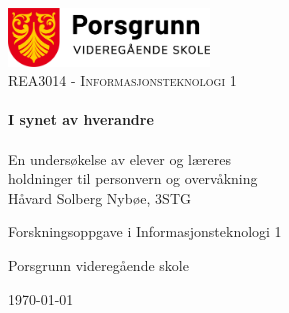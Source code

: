 \begin{titlepage}
    \vbox{ }

    \vbox{ }

    \begin{center}
        \includegraphics[width=0.40\textwidth]{img/porsgrunn-vgs.png}\\[1cm]
        \textsc{\Large REA3014 - Informasjonsteknologi 1}\\[0.6cm]

        \noindent\makebox[\linewidth]{\rule{.7\paperwidth}{.6pt}}\\[0.7cm]
        { \huge \bfseries I synet av hverandre}\\[0.25cm]
        \noindent\makebox[\linewidth]{\rule{.7\paperwidth}{.6pt}}\\[0.7cm]
        \large{En undersøkelse av elever og læreres\\ holdninger til personvern og overvåkning}\\[1.2cm]
        \vfill
        \large
        Håvard Solberg Nybøe, 3STG

        Forskningsoppgave i Informasjonsteknologi 1

        Porsgrunn videregående skole

            {\large \today}
    \end{center}
\end{titlepage}